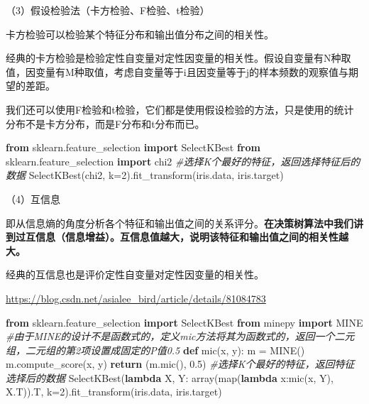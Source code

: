 \documentclass[
]{article}
\newenvironment{Shaded}{}{}
\newcommand{\BuiltInTok}[1]{\textcolor[rgb]{0.00,0.50,0.00}{#1}}
\newcommand{\CommentTok}[1]{\textcolor[rgb]{0.38,0.63,0.69}{\textit{#1}}}
\newcommand{\ControlFlowTok}[1]{\textcolor[rgb]{0.00,0.44,0.13}{\textbf{#1}}}
\newcommand{\DecValTok}[1]{\textcolor[rgb]{0.25,0.63,0.44}{#1}}
\newcommand{\FloatTok}[1]{\textcolor[rgb]{0.25,0.63,0.44}{#1}}
\newcommand{\ImportTok}[1]{\textcolor[rgb]{0.00,0.50,0.00}{\textbf{#1}}}
\newcommand{\KeywordTok}[1]{\textcolor[rgb]{0.00,0.44,0.13}{\textbf{#1}}}
\newcommand{\NormalTok}[1]{#1}
\newcommand{\OperatorTok}[1]{\textcolor[rgb]{0.40,0.40,0.40}{#1}}
\begin{document}
（3）假设检验法（卡方检验、F检验、t检验）

卡方检验可以检验某个特征分布和输出值分布之间的相关性。

经典的卡方检验是检验定性自变量对定性因变量的相关性。假设自变量有N种取值，因变量有M种取值，考虑自变量等于i且因变量等于j的样本频数的观察值与期望的差距。

我们还可以使用F检验和t检验，它们都是使用假设检验的方法，只是使用的统计分布不是卡方分布，而是F分布和t分布而已。

\begin{Shaded}
\begin{Highlighting}[]
\ImportTok{from}\NormalTok{ sklearn.feature\_selection }\ImportTok{import}\NormalTok{ SelectKBest}
\ImportTok{from}\NormalTok{ sklearn.feature\_selection }\ImportTok{import}\NormalTok{ chi2}
\CommentTok{\#选择K个最好的特征，返回选择特征后的数据}
\NormalTok{SelectKBest(chi2, k}\OperatorTok{=}\DecValTok{2}\NormalTok{).fit\_transform(iris.data, iris.target)}
\end{Highlighting}
\end{Shaded}

（4）互信息

即从信息熵的角度分析各个特征和输出值之间的关系评分。\textbf{在决策树算法中我们讲到过互信息（信息增益）。互信息值越大，说明该特征和输出值之间的相关性越大。}

经典的互信息也是评价定性自变量对定性因变量的相关性。

\url{https://blog.csdn.net/asialee_bird/article/details/81084783}

\begin{Shaded}
\begin{Highlighting}[]
\ImportTok{from}\NormalTok{ sklearn.feature\_selection }\ImportTok{import}\NormalTok{ SelectKBest}
\ImportTok{from}\NormalTok{ minepy }\ImportTok{import}\NormalTok{ MINE}
\CommentTok{\#由于MINE的设计不是函数式的，定义mic方法将其为函数式的，返回一个二元组，二元组的第2项设置成固定的P值0.5}
\KeywordTok{def}\NormalTok{ mic(x, y):}
\NormalTok{    m }\OperatorTok{=}\NormalTok{ MINE()}
\NormalTok{    m.compute\_score(x, y)}
    \ControlFlowTok{return}\NormalTok{ (m.mic(), }\FloatTok{0.5}\NormalTok{)}
\CommentTok{\#选择K个最好的特征，返回特征选择后的数据}
\NormalTok{SelectKBest(}\KeywordTok{lambda}\NormalTok{ X, Y: array(}\BuiltInTok{map}\NormalTok{(}\KeywordTok{lambda}\NormalTok{ x:mic(x, Y), X.T)).T, k}\OperatorTok{=}\DecValTok{2}\NormalTok{).fit\_transform(iris.data, iris.target)}
\end{Highlighting}
\end{Shaded}
\end{document}
